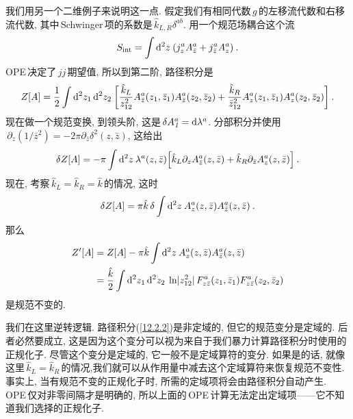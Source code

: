 我们用另一个二维例子来说明这一点. 假定我们有相同代数$\,g\,$的左移流代数和右移流代数, 其中\,Schwinger\,项的系数是$\,\hat{k}_{L,R}\delta^{ab}$. 用一个规范场耦合这个流
\begin{equation}
    S_{\text{int}}=\int\mathrm{d}^{2}z\:(j_{z}^{a}A_{\bar{z}}^{a}+j^{a}_{\bar{z}}A_{z}^{a}) \:. \label{12.2.1}
\end{equation}
OPE\,决定了\,$jj\,$期望值, 所以到第二阶, 路径积分是
\begin{equation}
    Z[A]=\frac{1}{2}\int\mathrm{d}^{2}z_{1}\,\mathrm{d}^{2}z_{2} \:
    \biggl[\frac{\hat{k}_{L}}{z_{12}^{2}}A_{\bar{z}}^{a}(z_{1},\bar{z}_{1})A_{\bar{z}}^{a}(z_{2},\bar{z}_{2})+\frac{\hat{k}_{R}}{\bar{z}_{12}^{2}}A_{z}^{a}(z_{1},\bar{z}_{1})A_{z}^{a}(z_{2},\bar{z}_{2})\biggr]\:. \label{12.2.2}
\end{equation}
现在做一个规范变换, 到领头阶, 这是$\,\delta A_{\textit{1}}^{a}=\mathrm{d}\lambda^{a}$. 分部积分并使用$\,\partial_{z}(1/\bar{z}^{2})=-2\pi\partial_{\bar{z}}\delta^{2}(z,\bar{z})$, 这给出
\begin{equation}
    \delta Z[A] = -\pi \int \mathrm{d}^{2}z\:\lambda^{a}(z,\bar{z})
    \Bigl[\hat{k}_{L}\partial_{z}A_{\bar{z}}^{a}(z,\bar{z})+\hat{k}_{R}\partial_{\bar{z}}A_{z}^{a}(z,\bar{z})\Bigr]\:.
    \label{12.2.3}
\end{equation}
现在, 考察$\,\hat{k}_{L}=\hat{k}_{R}=\hat{k}\,$的情况, 这时
\begin{equation}
    \delta Z[A] =\pi\hat{k}\,\delta\int\mathrm{d}^{2}z\:A_{z}^{a}(z,\bar{z})A_{\bar{z}}^{a}(z,\bar{z}) \:.
\end{equation}
那么
\begin{align}
    Z^{\prime}[A]&=Z[A]-\pi\hat{k}\int\mathrm{d}^{2}z\:A_{z}^{a}(z,\bar{z})A_{\bar{z}}^{a}(z,\bar{z}) \nonumber \\
    &=\frac{\hat{k}}{2}\int \mathrm{d}^{2}z_{1}\,\mathrm{d}^{2}z_{2}\:\ln\lvert z_{12}^{2}\rvert \,F^{a}_{z\bar{z}}(z_{1},\bar{z}_{1})F^{a}_{z\bar{z}}(z_{2},\bar{z}_{2})  \label{12.2.5}
\end{align}
是规范不变的.

我们在这里逆转逻辑. 路径积分(\ref{12.2.2})是非定域的, 但它的规范变分是定域的. 后者必然要成立, 这是因为这个变分可以视为来自于我们暴力计算路径积分时使用的正规化子. 尽管这个变分是定域的, 它一般不是定域算符的变分. 如果是的话, 就像这里$\,\hat{k}_{L}=\hat{k}_{R}\,$的情况,我们就可以从作用量中减去这个定域算符来恢复规范不变性. 事实上, 当有规范不变的正规化子时, 所需的定域项将会由路径积分自动产生. OPE\,仅对非零间隔才是明确的, 所以上面的\,OPE\,计算无法定出定域项------它不知道我们选择的正规化子.

